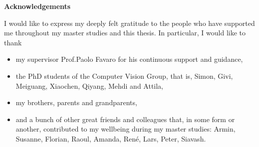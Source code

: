 \thispagestyle{empty}
\vspace{8cm}
\noindent
{\centerline {\bf \large Acknowledgements}}
\vspace{1cm}
\noindent

I would like to express my deeply felt gratitude to the people who have supported me throughout my master studies and this thesis.
In particular, I would like to thank 

\begin{itemize}
	\item my supervisor Prof.\@ Paolo Favaro for his continuous support and guidance, 
	
	\item the PhD students of the Computer Vision Group, that is, Simon, Givi, Meiguang, Xiaochen, Qiyang, Mehdi and Attila, 
	
	\item my brothers, parents and grandparents, 
	
	\item and a bunch of other great friends and colleagues that, in some form or another, contributed to my wellbeing during my master studies: Armin, Susanne, Florian, Raoul, Amanda, Ren\'e, Lars, Peter, Siavash.
	
\end{itemize}
